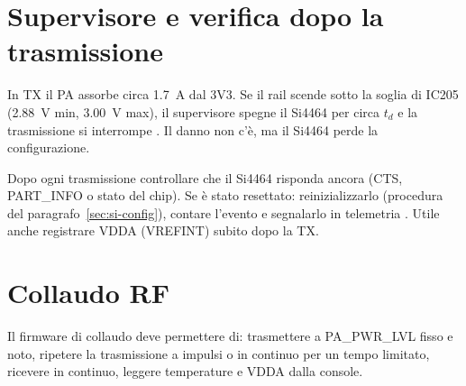 \section{Supervisore e verifica dopo la trasmissione}
\label{sec:rf-supervisore}
In TX il PA assorbe circa \SI{1.7}{\ampere} dal 3V3. Se il rail scende sotto la soglia di IC205 (\SI{2.88}{\volt} min, \SI{3.00}{\volt} max), il supervisore spegne il Si4464 per circa $t_d$ e la trasmissione si interrompe . Il danno non c'è, ma il Si4464 perde la configurazione.

\begin{regola}
Dopo ogni trasmissione controllare che il Si4464 risponda ancora (CTS, PART\_INFO o stato del chip). Se è stato resettato: reinizializzarlo (procedura del paragrafo~\ref{sec:si-config}), contare l'evento e segnalarlo in telemetria . Utile anche registrare VDDA (VREFINT) subito dopo la TX.
\end{regola}

\section{Collaudo RF}
\label{sec:collaudo}
Il firmware di collaudo deve permettere di: trasmettere a PA\_PWR\_LVL fisso e noto, ripetere la trasmissione a impulsi o in continuo per un tempo limitato, ricevere in continuo, leggere temperature e VDDA dalla console.

